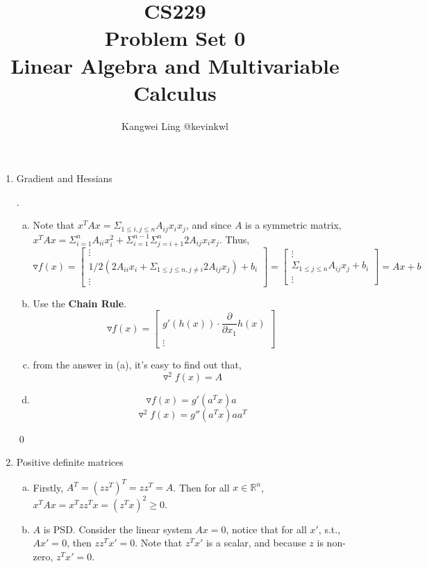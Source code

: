 \documentclass[11pt]{article}
\title{CS229 \\ Problem Set 0 \\ Linear Algebra and Multivariable Calculus}
\author{Kangwei Ling @kevinkwl}
\newenvironment{sol}
{\par\vspace{3mm}\noindent{\it Solution}.}
{\qed}
\begin{document}
\maketitle

\begin{enumerate}[1.]
\item Gradient and Hessians
  \begin{sol}
    \begin{enumerate}[(a)]
    \item Note that $x^TAx = \Sigma_{1 \leq i, j \leq n}A_{ij}x_ix_j$, and since
      $A$ is a symmetric matrix, $x^TAx = \Sigma_{i=1}^nA_{ii}x_i^2 +
      \Sigma_{i=1}^{n-1}\Sigma_{j=i+1}^n2A_{ij}x_ix_j$.
      Thus,
      \[
        \triangledown f(x) =
        \begin{bmatrix}
          \vdots \\
          1/2(2A_{ii}x_i + \Sigma_{1 \leq j \leq n, j \neq i}2A_{ij}x_j) + b_i \\
          \vdots
        \end{bmatrix}
        =
        \begin{bmatrix}
          \vdots \\
          \Sigma_{1 \leq j \leq n}A_{ij}x_j + b_i\\
          \vdots
        \end{bmatrix}
        = Ax + b
      \]
      
    \item Use the \textbf{Chain Rule}.
      \[
        \triangledown f(x) =
        \begin{bmatrix}
          g'(h(x)) \cdot \dfrac{\partial}{\partial
            x_1}h(x) \\
          \vdots
        \end{bmatrix}
      \]
    \item from the answer in (a), it's easy to find out that,
      \[
        \triangledown^2 f(x) = A
      \]
    \item
      \[
        \triangledown f(x) = g'(a^Tx)a
      \]
      \[
        \triangledown^2 f(x) = g''(a^Tx)aa^T
      \]
    \end{enumerate}
  \end{sol}
  
\item Positive definite matrices
  \begin{enumerate}[(a)]
  \item Firstly, $A^T = (zz^T)^T = zz^T = A$. Then for all $x \in \mathbb{R}^n$,
    $x^TAx = x^Tzz^Tx = (z^Tx)^2 \geq 0$.
  \item $A$ is PSD. Consider the linear system $Ax = 0$, notice that for all $x'$, s.t., $Ax' = 0$, then $zz^Tx' = 0$. Note that $z^Tx'$ is a
    scalar, and because $z$ is non-zero, $z^Tx' = 0$.


\end{enumerate}
\end{enumerate}
\end{document}
